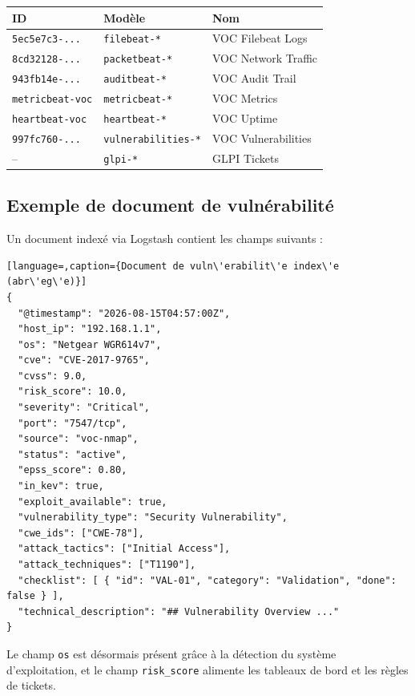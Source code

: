 \begin{center}
\small
\begin{tabularx}{\linewidth}{@{}l X l@{}}
\toprule
\textbf{ID} & \textbf{Mod\`ele} & \textbf{Nom} \\
\midrule
\texttt{5ec5e7c3-...} & \texttt{filebeat-*} & VOC Filebeat Logs \\
\texttt{8cd32128-...} & \texttt{packetbeat-*} & VOC Network Traffic \\
\texttt{943fb14e-...} & \texttt{auditbeat-*} & VOC Audit Trail \\
\texttt{metricbeat-voc} & \texttt{metricbeat-*} & VOC Metrics \\
\texttt{heartbeat-voc} & \texttt{heartbeat-*} & VOC Uptime \\
\texttt{997fc760-...} & \texttt{vulnerabilities-*} & VOC Vulnerabilities \\
-- & \texttt{glpi-*} & GLPI Tickets \\
\bottomrule
\end{tabularx}
\end{center}

\subsection{Exemple de document de vuln\'erabilit\'e}

Un document index\'e via Logstash contient les champs suivants :

\begin{lstlisting}[language=,caption={Document de vuln\'erabilit\'e index\'e (abr\'eg\'e)}]
{
  "@timestamp": "2026-08-15T04:57:00Z",
  "host_ip": "192.168.1.1",
  "os": "Netgear WGR614v7",
  "cve": "CVE-2017-9765",
  "cvss": 9.0,
  "risk_score": 10.0,
  "severity": "Critical",
  "port": "7547/tcp",
  "source": "voc-nmap",
  "status": "active",
  "epss_score": 0.80,
  "in_kev": true,
  "exploit_available": true,
  "vulnerability_type": "Security Vulnerability",
  "cwe_ids": ["CWE-78"],
  "attack_tactics": ["Initial Access"],
  "attack_techniques": ["T1190"],
  "checklist": [ { "id": "VAL-01", "category": "Validation", "done": false } ],
  "technical_description": "## Vulnerability Overview ..."
}
\end{lstlisting}

Le champ \texttt{os} est d\'esormais pr\'esent gr\^ace \`a la d\'etection du
syst\`eme d'exploitation, et le champ \texttt{risk\_score} alimente les
tableaux de bord et les r\`egles de tickets.

\clearpage

